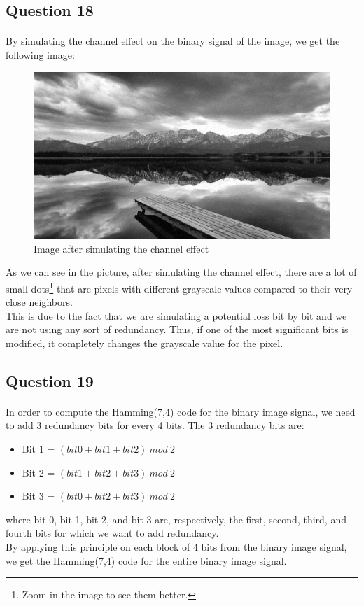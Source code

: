 \documentclass[a4paper, 11pt, oneside]{article}
\begin{document}

\subsection{Question 18}
\paragraph{}By simulating the channel effect on the binary signal of the image, we get the following image:
\begin{figure}[H]
    \centering
    \includegraphics[scale=0.2]{q18.png}
    \caption{Image after simulating the channel effect}
\end{figure}
As we can see in the picture, after simulating the channel effect, there are a lot of small dots\footnote{Zoom in the image to see them better.} that are pixels with different grayscale values
compared to their very close neighbors.\\
This is due to the fact that we are simulating a potential loss bit by bit and we are not using any sort of redundancy.
Thus, if one of the most significant bits is modified, it completely changes the grayscale value for the pixel.


\subsection{Question 19}
\paragraph{}In order to compute the Hamming(7,4) code for the binary image signal, we need to add 3 redundancy bits for every 4 bits. The 3 redundancy bits are:
\begin{itemize}
    \item Bit 1 = $(bit 0 + bit 1 + bit 2) \ mod \ 2$
    \item Bit 2 = $(bit 1 + bit 2 + bit 3) \ mod \ 2$
    \item Bit 3 = $(bit 0 + bit 2 + bit 3) \ mod \ 2$
\end{itemize}
where bit 0, bit 1, bit 2, and bit 3 are, respectively, the first, second, third, and fourth bits for which we want to add redundancy.\\
By applying this principle on each block of 4 bits from the binary image signal, we get the Hamming(7,4) code for the entire binary image signal.
\end{document}
